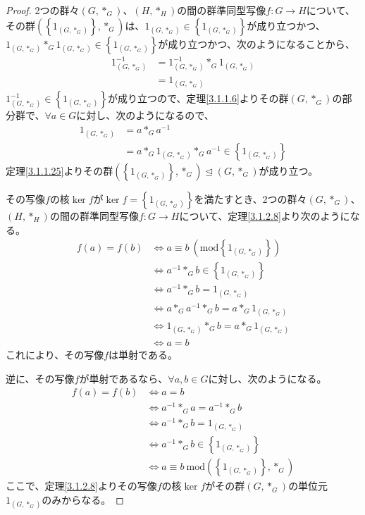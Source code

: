 \documentclass[dvipdfmx]{jsarticle}
\begin{document}
\begin{proof}
2つの群々$\left( G,*_{G} \right)$、$\left( H,*_{H} \right)$の間の群準同型写像$f:G \rightarrow H$について、その群$\left( \left\{ 1_{\left( G,*_{G} \right)} \right\},*_{G} \right)$は、$1_{\left( G,*_{G} \right)} \in \left\{ 1_{\left( G,*_{G} \right)} \right\}$が成り立つかつ、$1_{\left( G,*_{G} \right)}*_{G}1_{\left( G,*_{G} \right)} \in \left\{ 1_{\left( G,*_{G} \right)} \right\}$が成り立つかつ、次のようになることから、
\begin{align*}
1_{\left( G,*_{G} \right)}^{- 1} &= 1_{\left( G,*_{G} \right)}^{- 1}*_{G}1_{\left( G,*_{G} \right)}\\
&= 1_{\left( G,*_{G} \right)}
\end{align*}
$1_{\left( G,*_{G} \right)}^{- 1} \in \left\{ 1_{\left( G,*_{G} \right)} \right\}$が成り立つので、定理\ref{3.1.1.6}よりその群$\left( G,*_{G} \right)$の部分群で、$\forall a \in G$に対し、次のようになるので、
\begin{align*}
1_{\left( G,*_{G} \right)} &= a*_{G}a^{- 1}\\
&= a*_{G}1_{\left( G,*_{G} \right)}*_{G}a^{- 1} \in \left\{ 1_{\left( G,*_{G} \right)} \right\}
\end{align*}
定理\ref{3.1.1.25}よりその群$\left( \left\{ 1_{\left( G,*_{G} \right)} \right\},*_{G} \right) \trianglelefteq \left( G,*_{G} \right)$が成り立つ。\par
その写像$f$の核$\ker f$が$\ker f = \left\{ 1_{\left( G,*_{G} \right)} \right\}$を満たすとき、2つの群々$\left( G,*_{G} \right)$、$\left( H,*_{H} \right)$の間の群準同型写像$f:G \rightarrow H$について、定理\ref{3.1.2.8}より次のようになる。
\begin{align*}
f(a) = f(b) &\Leftrightarrow a \equiv b\ \left( \mathrm{mod}\left\{ 1_{\left( G,*_{G} \right)} \right\} \right)\\
&\Leftrightarrow a^{- 1}*_{G}b \in \left\{ 1_{\left( G,*_{G} \right)} \right\}\\
&\Leftrightarrow a^{- 1}*_{G}b = 1_{\left( G,*_{G} \right)}\\
&\Leftrightarrow a*_{G}a^{- 1}*_{G}b = a*_{G}1_{\left( G,*_{G} \right)}\\
&\Leftrightarrow 1_{\left( G,*_{G} \right)}*_{G}b = a*_{G}1_{\left( G,*_{G} \right)}\\
&\Leftrightarrow a = b
\end{align*}
これにより、その写像$f$は単射である。\par
逆に、その写像$f$が単射であるなら、$\forall a,b \in G$に対し、次のようになる。
\begin{align*}
f(a) = f(b) &\Leftrightarrow a = b\\
&\Leftrightarrow a^{- 1}*_{G}a = a^{- 1}*_{G}b\\
&\Leftrightarrow a^{- 1}*_{G}b = 1_{\left( G,*_{G} \right)}\\
&\Leftrightarrow a^{- 1}*_{G}b \in \left\{ 1_{\left( G,*_{G} \right)} \right\}\\
&\Leftrightarrow a \equiv b\ \mathrm{mod}\left( \left\{ 1_{\left( G,*_{G} \right)} \right\},*_{G} \right)
\end{align*}
ここで、定理\ref{3.1.2.8}よりその写像$f$の核$\ker f$がその群$\left( G,*_{G} \right)$の単位元$1_{\left( G,*_{G} \right)}$のみからなる。
\end{proof}
\end{document}
